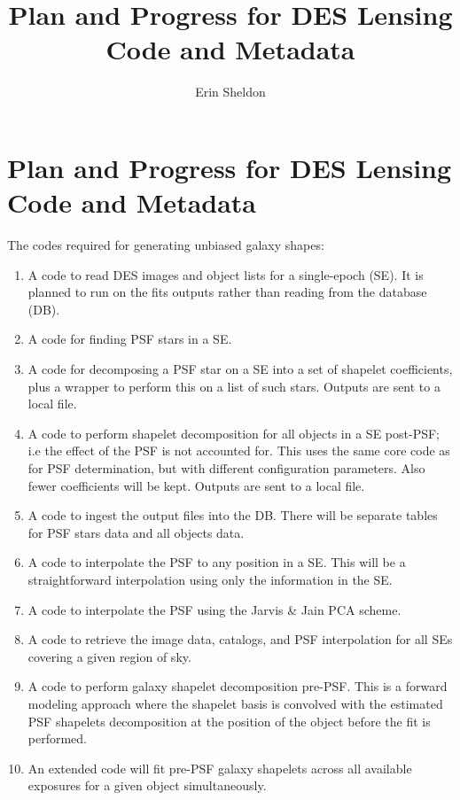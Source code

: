 \documentclass[12pt]{article}
\title{Plan and Progress for DES Lensing Code and Metadata}
\author{Erin Sheldon}
\begin{document}
\section*{Plan and Progress for DES Lensing Code and Metadata} 

The codes required for generating unbiased galaxy shapes:

\begin{enumerate}

    \item A code to read DES images and object lists for a single-epoch (SE).
        It is planned to run on the fits outputs rather than reading from the
        database (DB).

    \item A code for finding PSF stars in a SE.

    \item A code for decomposing a PSF star on a SE into a set of shapelet 
        coefficients, plus a wrapper to perform this on a list of such stars.
        Outputs are sent to a local file.

    \item A code to perform shapelet decomposition for all objects in a SE
        post-PSF; i.e the effect of the PSF is not accounted for.  This uses
        the same core code as for PSF determination, but with different
        configuration parameters.  Also fewer coefficients will be kept.
        Outputs are sent to a local file.

    \item A code to ingest the output files into the DB.  There will be
        separate tables for PSF stars data and all objects data.

    \item A code to interpolate the PSF to any position in a SE.  This will be
        a straightforward interpolation using only the information in the SE.

    \item A code to interpolate the PSF using the Jarvis \& Jain PCA scheme.

    \item A code to retrieve the image data, catalogs, and PSF interpolation
        for all SEs covering a given region of sky.

    \item A code to perform galaxy shapelet decomposition pre-PSF.  This is a
        forward modeling approach where the shapelet basis is convolved with
        the estimated PSF shapelets decomposition at the position of the object
        before the fit is performed.  

    \item An extended code will fit pre-PSF galaxy shapelets across all
        available exposures for a given object simultaneously.

\end{enumerate}
\end{document}
